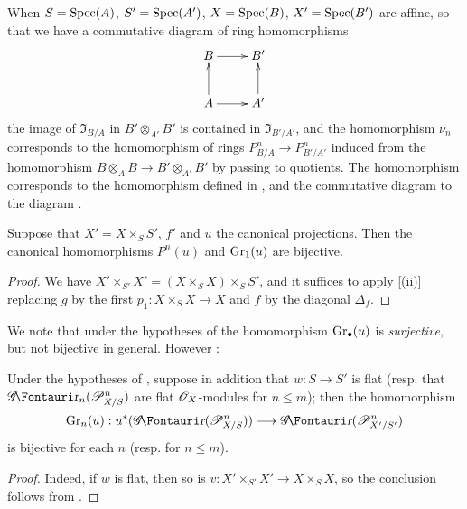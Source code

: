 \begin{env}[16.4.4]
\label{IV.16.4.4}
When $S = \operatorname{Spec}(A)$, $S' = \operatorname{Spec}(A')$, $X = \operatorname{Spec}(B)$, $X' = \operatorname{Spec}(B')$ are affine, so that we have a commutative diagram of ring homomorphisms
\[
  \xymatrix{
    B \ar[r] & B' \\
    A \ar[u] \ar[r] & A' \ar[u]
  }
\]
the image of $\mathfrak{I}_{B/A}$ in $B' \otimes_{A'} B'$ is contained in $\mathfrak{I}_{B'/A'}$, and the homomorphism $\nu_n$ corresponds to the homomorphism of rings $P_{B/A}^n \to P_{B'/A'}^n$ induced from the homomorphism $B \otimes_A B \to B' \otimes_{A'} B'$ by passing to quotients.
The homomorphism  corresponds to the homomorphism defined in , and the commutative diagram  to the diagram .
\end{env}

\begin{proposition}[16.4.5]
\label{IV.16.4.5}
Suppose that $X' = X \times_S S'$, $f'$ and $u$ the canonical projections.
Then the canonical homomorphisms $P^n(u)$  and $\operatorname{Gr}_1(u)$  are bijective.
\end{proposition}

\begin{proof}
We have $X' \times_{S'} X' = (X \times_S X) \times_S S'$, and it suffices to apply [(ii)] replacing $g$ by the first $p_1:X\times_S X \to X$ and $f$ by the diagonal $\Delta_f$.
\end{proof}

We note that under the hypotheses of  the homomorphism $\operatorname{Gr}_\bullet(u)$  is \emph{surjective}, but not bijective in general. 
However :

\begin{corollary}[16.4.6]
\label{IV.16.4.6}
Under the hypotheses of , suppose in addition that $w: S \to S'$ is flat (resp. that $\shGr_n(\sh{P}_{X/S}^n)$ are flat $\mathscr{O}_X$-modules for $n \leq m$);
then the homomorphism
\[
  \Gr_n(u):u^*(\shGr(\sh{P}_{X/S}^n)) \to \shGr(\sh{P}_{X'/S'}^n)
\]
is bijective for each $n$ (resp. for $n \leq m$).
\end{corollary}

\begin{proof}
Indeed, if $w$ is flat, then so is $v: X' \times_{S'} X' \to X \times_S X$, so the conclusion follows from .
\end{proof}

